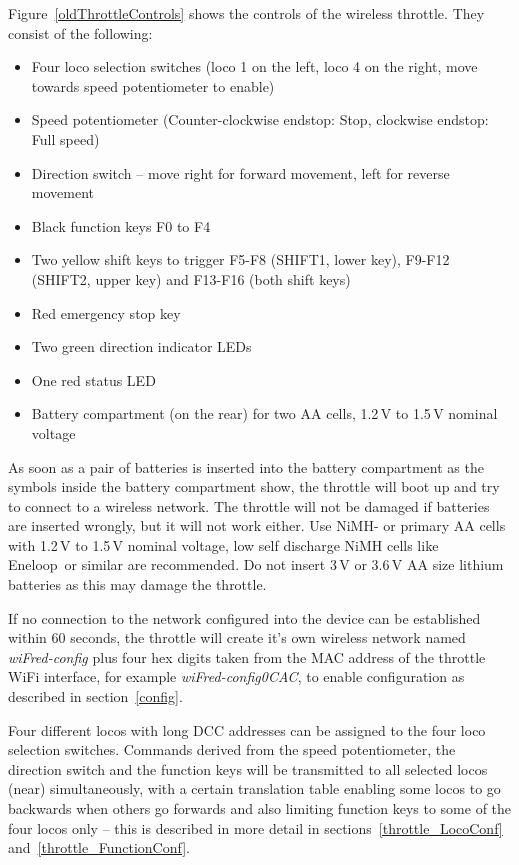 \documentclass[11pt,a4paper]{scrartcl}
\begin{document}
Figure~\ref{oldThrottleControls} shows the controls of the wireless throttle. They consist of the following:

\begin{itemize}
\item Four loco selection switches (loco 1 on the left, loco 4 on the right, move towards speed potentiometer to enable)
\item Speed potentiometer (Counter-clockwise endstop: Stop, clockwise endstop: Full speed)
\item Direction switch -- move right for forward movement, left for reverse movement
\item Black function keys F0 to F4
\item Two yellow shift keys to trigger F5-F8 (SHIFT1, lower key), F9-F12 (SHIFT2, upper key) and F13-F16 (both shift keys)
\item Red emergency stop key
\item Two green direction indicator LEDs
\item One red status LED
\item Battery compartment (on the rear) for two AA cells, 1.2\,V to 1.5\,V nominal voltage
\end{itemize}

As soon as a pair of batteries is inserted into the battery compartment as the symbols inside the battery compartment show, the throttle will boot up and try to connect to a wireless network. The throttle will not be damaged if batteries are inserted wrongly, but it will not work either. Use NiMH- or primary AA cells with 1.2\,V to 1.5\,V nominal voltage, low self discharge NiMH cells like Eneloop\textregistered\ or similar are recommended. Do not insert 3\,V or 3.6\,V AA size lithium batteries as this may damage the throttle.

If no connection to the network configured into the device can be established within 60 seconds, the throttle will create it's own wireless network named \textit{wiFred-config} plus four hex digits taken from the MAC address of the throttle WiFi interface, for example \textit{wiFred-config0CAC}, to enable configuration as described in section~\ref{config}.

Four different locos with long DCC addresses can be assigned to the four loco selection switches. Commands derived from the speed potentiometer, the direction switch and the function keys will be transmitted to all selected locos (near) simultaneously, with a certain translation table enabling some locos to go backwards when others go forwards and also limiting function keys to some of the four locos only -- this is described in more detail in sections~\ref{throttle_LocoConf} and~\ref{throttle_FunctionConf}.
\end{document}
